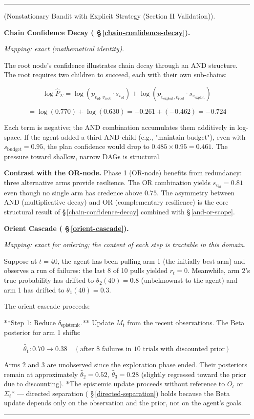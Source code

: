 \documentclass[11pt,oneside]{article}
\newcounter{claim}[section]
\renewcommand{\theclaim}{\thesection.\arabic{claim}}
\newenvironment{segment}[2]{%
  \refstepcounter{claim}%
  \bigskip\noindent\hrule\smallskip
  \noindent{\bfseries #1~\theclaim}\enskip(#2).\par\smallskip
  \noindent\ignorespaces
}{%
  \par\smallskip\noindent\hrule\bigskip
}
\newenvironment{remark}[1][]{\begin{segment}{Remark}{#1}}{\end{segment}}
\begin{document}
\begin{remark}[Nonstationary Bandit with Explicit Strategy (Section II Validation)]
\medskip\noindent\textbf{Chain Confidence Decay ( \S\,\ref{chain-confidence-decay}).}


\textit{Mapping: exact (mathematical identity).}

The root node's confidence illustrates chain decay through an AND structure. The root requires two children to succeed, each with their own sub-chains:

$$\log \hat P_\Sigma = \log(p_{v_\text{id}, v_\text{root}} \cdot s_{v_\text{id}}) + \log(p_{v_\text{exploit}, v_\text{root}} \cdot s_{v_\text{exploit}})$$

$$= \log(0.770) + \log(0.630) = -0.261 + (-0.462) = -0.724$$

Each term is negative; the AND combination accumulates them additively in log-space. If the agent added a third AND-child (e.g., "maintain budget"), even with $s_\text{budget} = 0.95$, the plan confidence would drop to $0.485 \times 0.95 = 0.461$. The pressure toward shallow, narrow DAGs is structural.

\textbf{Contrast with the OR-node.} Phase 1 (OR-node) benefits from redundancy: three alternative arms provide resilience. The OR combination yields $s_{v_\text{id}} = 0.81$ even though no single arm has credence above $0.75$. The asymmetry between AND (multiplicative decay) and OR (complementary resilience) is the core structural result of \S\,\ref{chain-confidence-decay} combined with \S\,\ref{and-or-scope}.


\medskip\noindent\textbf{Orient Cascade ( \S\,\ref{orient-cascade}).}


\textit{Mapping: exact for ordering; the content of each step is tractable in this domain.}

Suppose at $t = 40$, the agent has been pulling arm 1 (the initially-best arm) and observes a run of failures: the last 8 of 10 pulls yielded $r_t = 0$. Meanwhile, arm 2's true probability has drifted to $\theta_2(40) = 0.8$ (unbeknownst to the agent) and arm 1 has drifted to $\theta_1(40) = 0.3$.

The orient cascade proceeds:

**Step 1: Reduce $\delta_\text{epistemic}$.** Update $M_t$ from the recent observations. The Beta posterior for arm 1 shifts:

$$\hat\theta_1: 0.70 \to 0.38 \quad (\text{after 8 failures in 10 trials with discounted prior})$$

Arms 2 and 3 are unobserved since the exploration phase ended. Their posteriors remain at approximately $\hat\theta_2 = 0.52$, $\hat\theta_3 = 0.28$ (slightly regressed toward the prior due to discounting). *The epistemic update proceeds without reference to $O_t$ or $\Sigma_t$* — directed separation ( \S\,\ref{directed-separation}) holds because the Beta update depends only on the observation and the prior, not on the agent's goals.


\end{remark}
\end{document}
